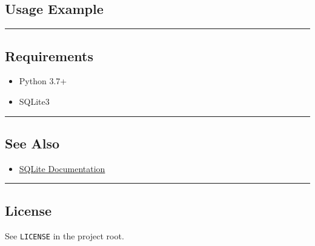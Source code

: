 \subsection{Usage Example}\label{usage-example}

\begin{Shaded}
\begin{Highlighting}[]
\OperatorTok{=}
\OperatorTok{=}
\end{Highlighting}
\end{Shaded}

\begin{center}\rule{0.5\linewidth}{0.5pt}\end{center}

\subsection{Requirements}\label{requirements}

\begin{itemize}
\tightlist
\item
  Python 3.7+
\item
  SQLite3
\end{itemize}

\begin{center}\rule{0.5\linewidth}{0.5pt}\end{center}

\subsection{See Also}\label{see-also}

\begin{itemize}
\tightlist
\item
  \href{https://sqlite.org/docs.html}{SQLite Documentation}
\end{itemize}

\begin{center}\rule{0.5\linewidth}{0.5pt}\end{center}

\subsection{License}\label{license}

See \texttt{LICENSE} in the project root.
